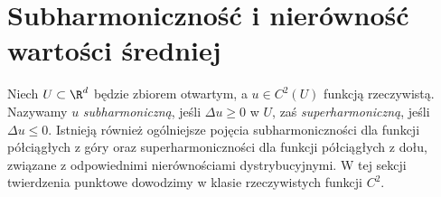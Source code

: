 \section{Subharmoniczność i nierówność wartości średniej}
\label{sec:pde14-subharmonic}
\begin{definicja}
Niech $U\subset\R^d$ będzie zbiorem otwartym,
a $u\in C^2(U)$ funkcją rzeczywistą.
Nazywamy $u$ \emph{subharmoniczną}, jeśli $\Delta u\ge0$
w $U$, zaś \emph{superharmoniczną}, jeśli $\Delta u\le0$.
Istnieją również ogólniejsze pojęcia subharmoniczności
dla funkcji półciągłych z góry oraz superharmoniczności
dla funkcji półciągłych z dołu, związane z odpowiednimi
nierównościami dystrybucyjnymi. W tej sekcji twierdzenia
punktowe dowodzimy w klasie rzeczywistych funkcji $C^2$.
\end{definicja}

